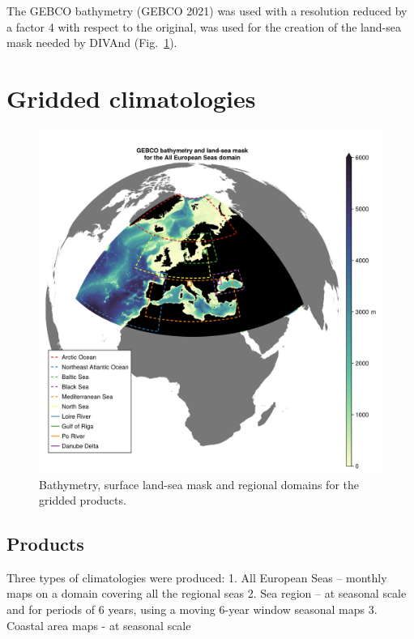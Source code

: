 \documentclass[essd, manuscript]{copernicus}
\begin{document}
The GEBCO bathymetry (GEBCO 2021) was used with a resolution reduced by a factor 4 with respect to the original, was used for the creation of the land-sea mask
needed by DIVAnd (Fig.~\ref{fig:gebco_bathy_mask_domains3}).


\section{Gridded climatologies\label{sec:clim}}

\citep{BUGA2021}


\begin{figure}[t]
\includegraphics[width=12cm]{gebco_bathy_mask_domains3}
\caption{Bathymetry, surface land-sea mask and regional domains for the gridded products.\label{fig:gebco_bathy_mask_domains3}}
\end{figure}

\subsection{Products}

Three types of climatologies were produced:
1. All European Seas – monthly maps on a domain covering all the regional seas
2. Sea region – at seasonal scale and for periods of 6 years, using a moving 6-year window
seasonal maps
3. Coastal area maps - at seasonal scale
\end{document}
